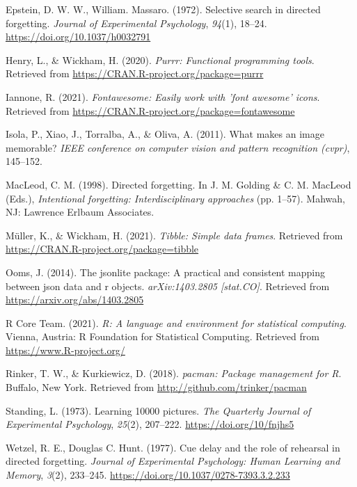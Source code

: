 \documentclass[
  english,
  man,floatsintext]{apa6}
\begin{document}
\leavevmode\hypertarget{ref-EpsteinW1972}{}%
Epstein, D. W. W., William. Massaro. (1972). Selective search in directed forgetting. \emph{Journal of Experimental Psychology}, \emph{94}(1), 18--24. \url{https://doi.org/10.1037/h0032791}

\leavevmode\hypertarget{ref-R-purrr}{}%
Henry, L., \& Wickham, H. (2020). \emph{Purrr: Functional programming tools}. Retrieved from \url{https://CRAN.R-project.org/package=purrr}

\leavevmode\hypertarget{ref-R-fontawesome}{}%
Iannone, R. (2021). \emph{Fontawesome: Easily work with 'font awesome' icons}. Retrieved from \url{https://CRAN.R-project.org/package=fontawesome}

\leavevmode\hypertarget{ref-Isola2011}{}%
Isola, P., Xiao, J., Torralba, A., \& Oliva, A. (2011). What makes an image memorable? \emph{IEEE conference on computer vision and pattern recognition (cvpr)}, 145--152.

\leavevmode\hypertarget{ref-macleodDirectedForgetting1998}{}%
MacLeod, C. M. (1998). Directed forgetting. In J. M. Golding \& C. M. MacLeod (Eds.), \emph{Intentional forgetting: Interdisciplinary approaches} (pp. 1--57). Mahwah, NJ: Lawrence Erlbaum Associates.

\leavevmode\hypertarget{ref-R-tibble}{}%
Müller, K., \& Wickham, H. (2021). \emph{Tibble: Simple data frames}. Retrieved from \url{https://CRAN.R-project.org/package=tibble}

\leavevmode\hypertarget{ref-R-jsonlite}{}%
Ooms, J. (2014). The jsonlite package: A practical and consistent mapping between json data and r objects. \emph{arXiv:1403.2805 {[}stat.CO{]}}. Retrieved from \url{https://arxiv.org/abs/1403.2805}

\leavevmode\hypertarget{ref-R-base}{}%
R Core Team. (2021). \emph{R: A language and environment for statistical computing}. Vienna, Austria: R Foundation for Statistical Computing. Retrieved from \url{https://www.R-project.org/}

\leavevmode\hypertarget{ref-R-pacman}{}%
Rinker, T. W., \& Kurkiewicz, D. (2018). \emph{pacman: Package management for R}. Buffalo, New York. Retrieved from \url{http://github.com/trinker/pacman}

\leavevmode\hypertarget{ref-standingLearning10000Pictures1973}{}%
Standing, L. (1973). Learning 10000 pictures. \emph{The Quarterly Journal of Experimental Psychology}, \emph{25}(2), 207--222. \url{https://doi.org/10/fnjhs5}

\leavevmode\hypertarget{ref-WetzelC1977}{}%
Wetzel, R. E., Douglas C. Hunt. (1977). Cue delay and the role of rehearsal in directed forgetting. \emph{Journal of Experimental Psychology: Human Learning and Memory}, \emph{3}(2), 233--245. \url{https://doi.org/10.1037/0278-7393.3.2.233}
\end{document}
